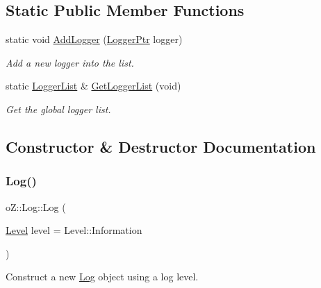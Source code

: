 \subsection*{Static Public Member Functions}
\begin{DoxyCompactItemize}
\item 
static void \mbox{\hyperlink{classo_z_1_1_log_a09f81a16467abe5e5f38d4caf9d9e738}{Add\+Logger}} (\mbox{\hyperlink{namespaceo_z_aaa2fbabbfafc6616a7e69651b62a3d4e}{Logger\+Ptr}} logger)
\begin{DoxyCompactList}\small\item\em Add a new logger into the list. \end{DoxyCompactList}\item 
static \mbox{\hyperlink{namespaceo_z_a2d18a70272709242e8e7ebffc3f1806c}{Logger\+List}} \& \mbox{\hyperlink{classo_z_1_1_log_aa1c737e66220f5f6f2f557c054b44e48}{Get\+Logger\+List}} (void)
\begin{DoxyCompactList}\small\item\em Get the global logger list. \end{DoxyCompactList}\end{DoxyCompactItemize}


\subsection{Constructor \& Destructor Documentation}
\mbox{\label{classo_z_1_1_log_a0f33f010674a2df29d7187bc7a433db2}} 
\subsubsection{\texorpdfstring{Log()}{Log()}}
{\footnotesize\ttfamily o\+Z\+::\+Log\+::\+Log (\begin{DoxyParamCaption}\item[{\mbox{\hyperlink{namespaceo_z_a72fc7662d5f07391ac6f0a5699014bfa}{Level}}}]{level = {\ttfamily Level\+:\+:Information} }\end{DoxyParamCaption})\hspace{0.3cm}{\ttfamily [inline]}}



Construct a new \mbox{\hyperlink{classo_z_1_1_log}{Log}} object using a log level. 

\mbox{\label{classo_z_1_1_log_a28d6db7c25427e63d38eebfc05290b52}} 
